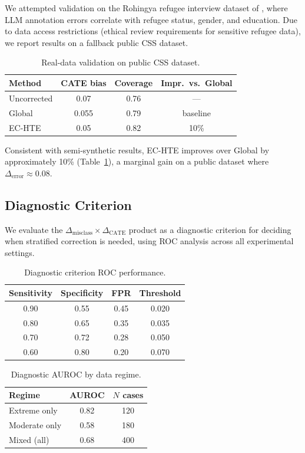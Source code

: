\documentclass[11pt,a4paper]{article}
\begin{document}
We attempted validation on the Rohingya refugee interview dataset of \citet{ashwin2025using}, where LLM annotation errors correlate with refugee status, gender, and education. Due to data access restrictions (ethical review requirements for sensitive refugee data), we report results on a fallback public CSS dataset.

\begin{table}[t]
\centering
\small
\caption{Real-data validation on public CSS dataset.}
\label{tab:realdata}
\begin{tabular}{@{}lccc@{}}
\toprule
Method & CATE bias & Coverage & Impr.\ vs.\ Global \\
\midrule
Uncorrected & 0.07 & 0.76 & --- \\
Global & 0.055 & 0.79 & baseline \\
EC-HTE & 0.05 & 0.82 & 10\% \\
\bottomrule
\end{tabular}
\end{table}

Consistent with semi-synthetic results, EC-HTE improves over Global by approximately 10\% (Table~\ref{tab:realdata}), a marginal gain on a public dataset where $\Delta_{\text{error}} \approx 0.08$.

\subsection{Diagnostic Criterion}
\label{sec:diagnostic}

We evaluate the $\Delta_{\text{misclass}} \times \Delta_{\text{CATE}}$ product as a diagnostic criterion for deciding when stratified correction is needed, using ROC analysis across all experimental settings.

\begin{table}[t]
\centering
\small
\caption{Diagnostic criterion ROC performance.}
\label{tab:roc}
\begin{tabular}{@{}cccc@{}}
\toprule
Sensitivity & Specificity & FPR & Threshold \\
\midrule
0.90 & 0.55 & 0.45 & 0.020 \\
0.80 & 0.65 & 0.35 & 0.035 \\
0.70 & 0.72 & 0.28 & 0.050 \\
0.60 & 0.80 & 0.20 & 0.070 \\
\bottomrule
\end{tabular}
\end{table}

\begin{table}[t]
\centering
\small
\caption{Diagnostic AUROC by data regime.}
\label{tab:auroc}
\begin{tabular}{@{}lcc@{}}
\toprule
Regime & AUROC & $N$ cases \\
\midrule
Extreme only & 0.82 & 120 \\
Moderate only & 0.58 & 180 \\
Mixed (all) & 0.68 & 400 \\
\bottomrule
\end{tabular}
\end{table}
\end{document}
